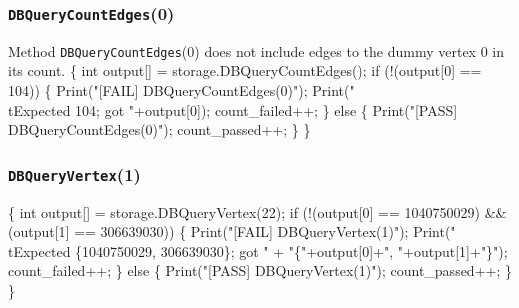 \documentclass{article}
\def\nwendcode{\endtrivlist \endgroup}
\let\nwdocspar=\par
\begin{document}
\subsubsection{{\tt{}DBQueryCountEdges}(0)}
Method {\tt{}DBQueryCountEdges}(0) does not include edges to the dummy vertex 0 in
its count.
\nwenddocs{}\endmoddef{}
\{
  int output[] = storage.DBQueryCountEdges();
  if (!(output[0] == 104)) \{
    Print("[FAIL] DBQueryCountEdges(0)");
    Print("\\tExpected 104; got "+output[0]);
    count_failed++;
  \} else \{
    Print("[PASS] DBQueryCountEdges(0)");
    count_passed++;
  \}
\}
\nwendcode{}\nwdocspar
\subsubsection{{\tt{}DBQueryVertex}(1)}
\nwenddocs{}\endmoddef{}
\{
  int output[] = storage.DBQueryVertex(22);
  if (!(output[0] == 1040750029)
    && (output[1] == 306639030)) \{
    Print("[FAIL] DBQueryVertex(1)");
    Print("\\tExpected \{1040750029, 306639030\}; got "
      + "\{"+output[0]+", "+output[1]+"\}");
    count_failed++;
  \} else \{
    Print("[PASS] DBQueryVertex(1)");
    count_passed++;
  \}
\}
\nwendcode{}\nwdocspar
\end{document}
